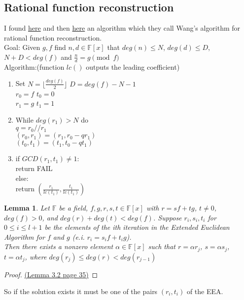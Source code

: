 \documentclass[12pt]{article}
\newcommand{\floor}[1]{\lfloor #1 \rfloor}
\newtheorem{lemma}{Lemma}
\begin{document}
\subsection{Rational function reconstruction}
I found \href{http://www.cecm.sfu.ca/~mmonagan/theses/sara.pdf}{here} and then \href{http://www.cecm.sfu.ca/~mmonagan/papers/fastRFR.pdf}{here}
an algorithm which they call Wang's algorithm for rational function reconstruction.\\
Goal: Given $g,f$ find $n, d \in \mathbb{F}[x]$ that $deg(n) \leq N$, $deg(d) \leq D$, $N + D < deg(f)$ and $\frac{n}{d} = g \pmod{f}$\\
Algorithm:(function $lc()$ outputs the leading coefficient)
\begin{enumerate}
	\item Set $N = \floor{\frac{deg(f)}{2}}$ $D = deg(f) - N - 1$\\
			$r_0 = f$  $t_0 = 0$\\
			$r_1 = g$  $t_1 = 1$\\
	\item While $deg(r_1) > N$ do\\
			$q = r_0 // r_1$\\
			$(r_0, r_1) = (r_1, r_0 - qr_1)$\\
			$(t_0, t_1) = (t_1, t_0 - qt_1)$\\
	\item if $GCD(r_1, t_1) \neq 1$:\\
			return FAIL\\
		  else:\\
			return $(\frac{r_1}{lc(t_1)}, \frac{t_1}{lc(t_1)})$
\end{enumerate}
\begin{lemma}
Let $\mathbb{F}$ be a field, $f, g, r, s, t \in \mathbb{F}[x]$ with $r = sf + tg$, $t \neq 0$, $deg(f) > 0$, and $deg(r) + deg(t) <deg(f)$.
Suppose $r_i, s_i, t_i$ for $0 \leq i \leq l + 1$ be the elements of the ith iteration in the Extended Euclidean Algorithm for $f$ and $g$ (e.i. $r_i = s_if + t_ig$). \\
Then there exists a nonzero element $\alpha \in \mathbb{F}[x]$ such that $r = \alpha r_j$, $s = \alpha s_j$, $t = \alpha t_j$, where $deg(r_j) \leq deg(r) < deg(r_{j-1})$
\end{lemma}
\begin{proof}
\href{http://www.cecm.sfu.ca/~mmonagan/theses/sara.pdf}{(Lemma 3.2 page 35)}
\end{proof}

So if the solution exists it must be one of the pairs $(r_i, t_i)$ of the EEA.
\end{document}
